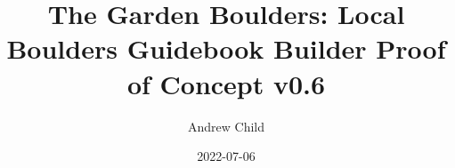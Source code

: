 \documentclass[10pt]{report}
\begin{document}
\title{The Garden Boulders: Local Boulders Guidebook Builder Proof of Concept v0.6}
\author{Andrew Child}
\date{2022-07-06}
\maketitle

\newcommand\chapterColor{MidnightBlue}

\twocolumn
\renewcommand\chapterColor{BrickRed}

\renewcommand\chapterColor{BurntOrange}

\renewcommand\chapterColor{PineGreen}

\renewcommand\chapterColor{RoyalPurple}

\end{document}

